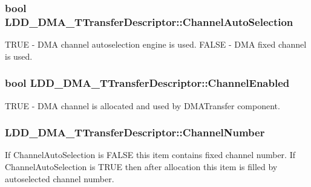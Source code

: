 \subsubsection[{Channel\+Auto\+Selection}]{\setlength{\rightskip}{0pt plus 5cm}bool L\+D\+D\+\_\+\+D\+M\+A\+\_\+\+T\+Transfer\+Descriptor\+::\+Channel\+Auto\+Selection}\label{struct_l_d_d___d_m_a___t_transfer_descriptor_aae81aa421cebab862ae4b8ca9d384318}
T\+R\+U\+E -\/ D\+M\+A channel autoselection engine is used. F\+A\+L\+S\+E -\/ D\+M\+A fixed channel is used. \hypertarget{struct_l_d_d___d_m_a___t_transfer_descriptor_acf5f8fe95f319b19a591880ed8a7a3c0}{}
\subsubsection[{Channel\+Enabled}]{\setlength{\rightskip}{0pt plus 5cm}bool L\+D\+D\+\_\+\+D\+M\+A\+\_\+\+T\+Transfer\+Descriptor\+::\+Channel\+Enabled}\label{struct_l_d_d___d_m_a___t_transfer_descriptor_acf5f8fe95f319b19a591880ed8a7a3c0}
T\+R\+U\+E -\/ D\+M\+A channel is allocated and used by D\+M\+A\+Transfer component. \hypertarget{struct_l_d_d___d_m_a___t_transfer_descriptor_a22d5f3770a3c62c4bb7e426b4d5d96c8}{}
\subsubsection[{Channel\+Number}]{ L\+D\+D\+\_\+\+D\+M\+A\+\_\+\+T\+Transfer\+Descriptor\+::\+Channel\+Number}\label{struct_l_d_d___d_m_a___t_transfer_descriptor_a22d5f3770a3c62c4bb7e426b4d5d96c8}
If Channel\+Auto\+Selection is F\+A\+L\+S\+E this item contains fixed channel number. If Channel\+Auto\+Selection is T\+R\+U\+E then after allocation this item is filled by autoselected channel number. \hypertarget{struct_l_d_d___d_m_a___t_transfer_descriptor_a36982f9f85fdeab04f7942d173f9bcb7}{}
